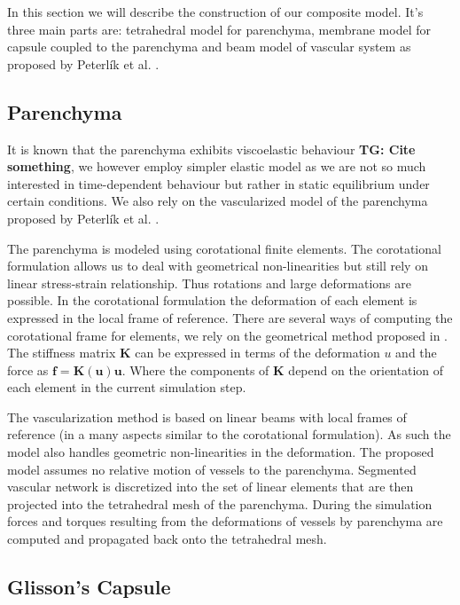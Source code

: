 \documentclass{llncs}
\newcommand{\TG}[1]{{\color{blue}\textbf{TG: #1}}}
\newcommand{\Vec}[1]{\mathbf{#1}}
\newcommand{\Mat}[1]{\mathbf{#1}}
\begin{document}
In this section we will describe the construction of our composite model.
It's three main parts are: tetrahedral model for parenchyma, membrane model
for capsule coupled to the parenchyma and beam model of vascular system as
proposed by Peterl\'{i}k et al. \cite{Peterlik2012}.

\subsection{Parenchyma} %

It is known that the parenchyma exhibits viscoelastic behaviour \TG{Cite
something}, we however employ simpler elastic model as we are not so much
interested in time-dependent behaviour but rather in static equilibrium
under certain conditions.
We also rely on the vascularized model of the parenchyma proposed by
Peterl\'{i}k et al. \cite{Peterlik2012}.

The parenchyma is modeled using corotational finite elements. The corotational
formulation allows us to deal with geometrical non-linearities but still
rely on linear stress-strain relationship. Thus rotations and large
deformations are possible. In the corotational formulation the deformation
of each element is expressed in the local frame of reference. There are
several ways of computing the corotational frame for elements, we rely on
the geometrical method proposed in \cite{Nesme2005}.
The stiffness matrix $\Mat{K}$ can be expressed in terms of the deformation
$u$ and the force as $\Vec{f} = \Mat{K}(\Vec{u}) \Vec{u}$. Where the
components of $\Mat{K}$ depend on the orientation of each element in the
current simulation step.

The vascularization method is based on linear beams
with local frames of reference (in a many aspects similar to the
corotational formulation). As such the model also handles geometric
non-linearities in the deformation. The proposed model assumes no relative
motion of vessels to the parenchyma. Segmented vascular network is
discretized into the set of linear elements that are then projected into
the tetrahedral mesh of the parenchyma. During the simulation forces and
torques resulting from the deformations of vessels by parenchyma are
computed and propagated back onto the tetrahedral mesh.


\subsection{Glisson's Capsule} %
\end{document}
